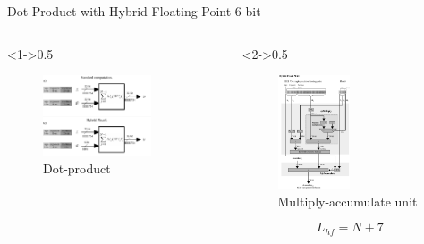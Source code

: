 \begin{frame}{Dot-Product with Hybrid Floating-Point 6-bit}
	\begin{columns}[c] %
		
		\begin{column}<1->{0.5\textwidth}\centering
			\begin{figure}
				\includegraphics[width=0.75\textwidth]{../chapters/cnn_accelerator/figures/dot-product_unit.pdf} %
				\caption{Dot-product}
			\end{figure}
		\end{column}
		
		\begin{column}<2->{0.5\textwidth}
			\begin{figure}
				\includegraphics[width=0.5\textwidth]{../chapters/cnn_accelerator/figures/multiplier.pdf} %
				\caption{Multiply-accumulate unit}
			\end{figure}
		\scriptsize
		\[ L_{hf}=N+7 \]
		\end{column}
		
	\end{columns}
\end{frame}

